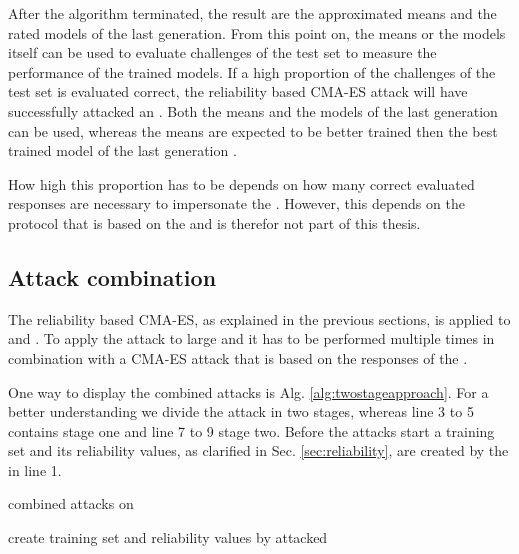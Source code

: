 After the algorithm terminated, the result are the approximated means and the rated models of the last generation.
From this point on, the means or the models itself can be used to evaluate challenges of the test set to measure the performance of the trained models. 
If a high proportion of the challenges of the test set is evaluated correct, the reliability based \ac{CMA-ES} attack will have successfully attacked an \apuf. %
Both the means and the models of the last generation can be used, whereas the means are expected to be better trained then the best trained model of the last generation \cite{Wikipedia2017CMA-ES}.

How high this proportion has to be depends on how many correct evaluated responses are necessary to impersonate the \puf.
However, this depends on the protocol that is based on the \puf and is therefor not part of this thesis.


\subsection{Attack combination}
\label{sec:attackcombination}

The reliability based \ac{CMA-ES}, as explained in the previous sections, is applied to \apufs and \mpuf.
To apply the attack to large \xpufs and \mxpuf it has to be performed multiple times in combination with a \ac{CMA-ES} attack that is based on the responses of the \puf \cite{Becker2015ThePUFs}.

One way to display the combined attacks is Alg. \ref{alg:twostageapproach}.
For a better understanding we divide the attack in two stages, whereas line 3 to 5 contains stage one and line 7 to 9 stage two.
Before the attacks start a training set and its reliability values, as clarified in Sec. \ref{sec:reliability}, are created by the \xpuf in line 1.

\SetAlCapHSkip{0.2em}
\begin{algorithm}[H] %
\Indm
\SetAlgoLined
\caption{combined attacks on \xpufs}
\label{alg:twostageapproach}
\Indp

create training set and reliability values by attacked \xpuf\\

\end{algorithm}

